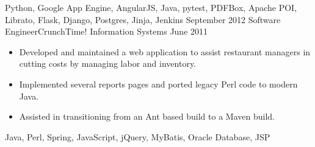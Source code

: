 \begin{experiences}
{                  }
                  {Python, Google App Engine, AngularJS, Java, pytest, PDFBox, Apache POI, Librato, Flask, Django, Postgres, Jinja, Jenkins}
\emptySeparator
  \experience
  {September 2012}  {Software Engineer}{CrunchTime! Information Systems}
  {June 2011}   {
                      \begin{itemize}
                        \item Developed and maintained a web application to assist restaurant managers in cutting costs by managing labor and inventory.
                        \item Implemented several reports pages and ported legacy Perl code to modern Java.   
                        \item Assisted in transitioning from an Ant based build to a Maven build.
                      \end{itemize}
                  }
                  {Java, Perl, Spring, JavaScript, jQuery, MyBatis, Oracle Database, JSP}
\end{experiences}
